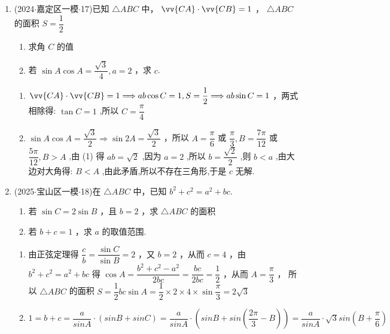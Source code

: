\begin{enumerate}
    \item (2024$\cdot$嘉定区一模$\cdot$17)已知 $\bigtriangleup  {ABC}$ 中， $\vv{CA} \cdot  \vv{CB} = 1$ ， $\bigtriangleup  {ABC}$ 的面积 $S = \dfrac{1}{2}$ 
    \begin{enumerate}
        \item 求角 $C$ 的值
        \item 若 $\sin A\cos A = \dfrac{\sqrt{3}}{4},a = 2$ ，求 $c$.
    \end{enumerate}
    \begin{jieda}
        \begin{enumerate}
            \item $\vv{CA} \cdot  \vv{CB} = 1 \Longrightarrow  {ab}\cos C = 1,S = \dfrac{1}{2} \Longrightarrow  {ab}\sin C = 1$ ，两式相除得: $\tan C = 1$ ,所以 $C = \dfrac{\pi }{4}$ 
            \item $\sin A\cos A = \dfrac{\sqrt{3}}{2} \Longrightarrow  \sin {2A} = \dfrac{\sqrt{3}}{2}$ ，所以 $A = \dfrac{\pi }{6}$ 或 $\dfrac{\pi }{3},B = \dfrac{7\pi }{12}$ 或 $\dfrac{5\pi }{12},B > A$ ,由 (1) 得 ${ab} = \sqrt{2}$ ,因为 $a = 2$ ,所以 $b = \dfrac{\sqrt{2}}{2}$ ,则 $b < a$ ,由大边对大角得: $B < A$ ,由此矛盾,所以不存在三角形,于是 $c$ 无解.
        \end{enumerate}
    \end{jieda}

    \item (2025$\cdot$宝山区一模$\cdot$18)在 $\bigtriangleup  {ABC}$ 中，已知 ${b}^{2} + {c}^{2} = {a}^{2} + {bc}$.
    \begin{enumerate}
        \item 若 $\sin C = {2\sin B}$ ，且 $b = 2$ ，求 $\bigtriangleup  {ABC}$ 的面积
        \item 若 $b + c = 1$ ，求 $a$ 的取值范围.
    \end{enumerate}
    \begin{jieda}
        \begin{enumerate}
            \item 由正弦定理得 $\dfrac{c}{b} = \dfrac{\sin C}{\sin B} = 2$ ，又 $b = 2$ ，从而 $c = 4$ ，由 ${b}^{2} + {c}^{2} = {a}^{2} + {bc}$ 得 $\cos A = \dfrac{{b}^{2} + {c}^{2} - {a}^{2}}{2bc} = \dfrac{bc}{2bc} = \dfrac{1}{2}$ ，从而 $A = \dfrac{\pi }{3}$ ， 所以 $\bigtriangleup {ABC}$ 的面积 $S = \dfrac{1}{2}{bc}\sin A = \dfrac{1}{2} \times  2 \times  4 \times  \sin \dfrac{\pi }{3} = 2\sqrt{3}$
            \item $1 = b + c = \dfrac{a}{sinA} \cdot (sinB + sinC) = \dfrac{a}{sinA} \cdot \left(sinB + sin\left(\dfrac{2\pi}{3} - B\right)\right) = \dfrac{a}{sinA} \cdot \sqrt{3}sin\left(B + \dfrac{\pi}{6}\right)$
            

\end{enumerate}
\end{jieda}
\end{enumerate}
